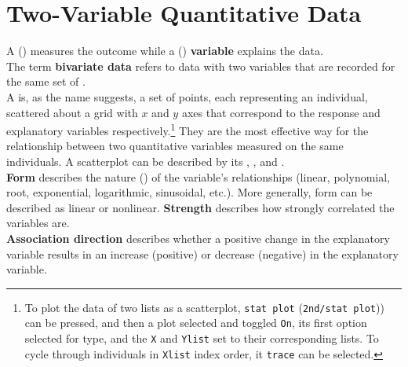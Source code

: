 \documentclass[../AP_Statistics.tex]{subfiles}
\begin{document}
	\chapter{Two-Variable Quantitative Data}
		A  ()  measures the outcome while a  () \textbf{variable} explains the data. \\
		The term \textbf{bivariate data} refers to data with two variables that are recorded for the same set of . \\
		A  is, as the name suggests, a set of points, each representing an individual, scattered about a grid with $x$ and $y$ axes that correspond to the response and explanatory variables respectively.\footnote{To plot the data of two lists as a scatterplot, \texttt{stat plot} (\texttt{2nd/stat plot})) can be pressed, and then a plot selected and toggled \texttt{On}, its first option selected for type, and the \texttt{X} and \texttt{Ylist} set to their corresponding lists. To cycle through individuals in \texttt{Xlist} index order, it \texttt{trace} can be selected.} They are the most effective way for the relationship between two quantitative variables measured on the same individuals.
		A scatterplot can be described by its , , and . \\
		\textbf{Form} describes the nature () of the variable's relationships (linear, polynomial, root, exponential, logarithmic, sinusoidal, etc.). More generally, form can be described as linear or nonlinear.
		\textbf{Strength} describes how strongly correlated the variables are. \\
		\textbf{Association direction} describes whether a positive change in the explanatory variable results in an increase (positive) or decrease (negative) in the explanatory variable.
\end{document}
